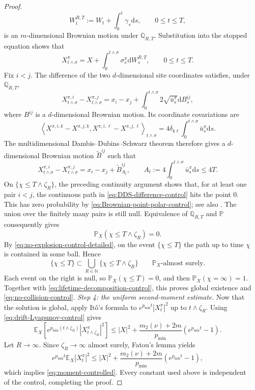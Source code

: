\documentclass[11pt]{article}
\def\E{\mathbb{E}}
\def\P{\mathbb{P}}
\def\Q{\mathbb{Q}}
\newcommand{\dd}{\mathrm{d}}
\newcommand{\pmin}{p_{\min}}
\theoremstyle{definition}
\theoremstyle{remark}
\numberwithin{equation}{section}
\begin{document}
\begin{proof}
\begin{equation}
 W_t^{R,T}:=W_t+\int_0^t\gamma_s\dd s,
 \qquad 0\le t\le T,
\end{equation}
is an $m$-dimensional Brownian motion under $\Q_{R,T}$.  Substitution into the stopped equation
shows that
\begin{equation}\label{eq:zero-drift-stopped-control}
 X_{t\wedge\sigma}^\pi
 =X+\int_0^{t\wedge\sigma}\sigma_s^\pi\dd W_s^{R,T},
 \qquad 0\le t\le T.
\end{equation}
Fix $i<j$.  The difference of the two $d$-dimensional site coordinates satisfies, under
$\Q_{R,T}$,
\begin{equation}\label{eq:difference-local-martingale}
 X_{t\wedge\sigma}^{\pi,i}-X_{t\wedge\sigma}^{\pi,j}
 =x_i-x_j+\int_0^{t\wedge\sigma}2\sqrt{\bar u_s^\pi}\dd B_s^{ij},
\end{equation}
where $B^{ij}$ is a $d$-dimensional Brownian motion.  Its coordinate covariations are
\begin{equation}\label{eq:qv-difference}
 \left\langle X^{\pi,i,k}-X^{\pi,j,k},
 X^{\pi,i,\ell}-X^{\pi,j,\ell}\right\rangle_{t\wedge\sigma}
 =4\delta_{k\ell}\int_0^{t\wedge\sigma}\bar u_s^\pi\dd s.
\end{equation}
The multidimensional Dambis--Dubins--Schwarz theorem therefore gives a $d$-dimensional Brownian
motion $\widetilde B^{ij}$ such that
\begin{equation}\label{eq:DDS-difference-control}
 X_{t\wedge\sigma}^{\pi,i}-X_{t\wedge\sigma}^{\pi,j}
 =x_i-x_j+\widetilde B^{ij}_{A_t},
 \qquad
 A_t:=4\int_0^{t\wedge\sigma}\bar u_s^\pi\dd s\le4T.
\end{equation}
On $\{\chi\le T\wedge\zeta_R\}$, the preceding continuity argument shows that,
for at least one pair $i<j$, the continuous path in
\eqref{eq:DDS-difference-control} hits the point $0$.  This has zero probability by
\eqref{eq:Brownian-point-polar-control}; see also
\cite[Chapters~V and XI]{RevuzYor1999}.  The union over the finitely many pairs is still null.
Equivalence of $\Q_{R,T}$ and $\P$ consequently gives
\[
 \P_X(\chi\le T\wedge\zeta_R)=0.
\]
By \eqref{eq:no-explosion-control-detailed}, on the event $\{\chi\le T\}$ the path up to time
$\chi$ is contained in some ball.  Hence
\[
 \{\chi\le T\}\subset
 \bigcup_{R\in\mathbb N}\{\chi\le T\wedge\zeta_R\}
 \qquad\P_X\text{-almost surely}.
\]
Each event on the right is null, so $\P_X(\chi\le T)=0$, and then
$\P_X(\chi=\infty)=1$.  Together with \eqref{eq:lifetime-decomposition-control}, this proves
global existence and \eqref{eq:no-collision-control}.
\medskip
\noindent\textit{Step 4: the uniform second-moment estimate.}
Now that the solution is global, apply It\^o's formula to
$e^{\pmin t}|X_t^\pi|^2$ up to $t\wedge\zeta_R$.  Using
\eqref{eq:drift-Lyapunov-control} gives
\[
 \E_X\left[e^{\pmin(t\wedge\zeta_R)}
 |X_{t\wedge\zeta_R}^\pi|^2\right]
 \le |X|^2+\frac{m_2(\nu)+2m}{\pmin}(e^{\pmin t}-1).
\]
Let $R\to\infty$.  Since $\zeta_R\to\infty$ almost surely, Fatou's lemma yields
\[
 e^{\pmin t}\E_X|X_t^\pi|^2
 \le |X|^2+\frac{m_2(\nu)+2m}{\pmin}(e^{\pmin t}-1),
\]
which implies \eqref{eq:moment-controlled}.  Every constant used above is independent of the
control, completing the proof.
\end{proof}
\end{document}
